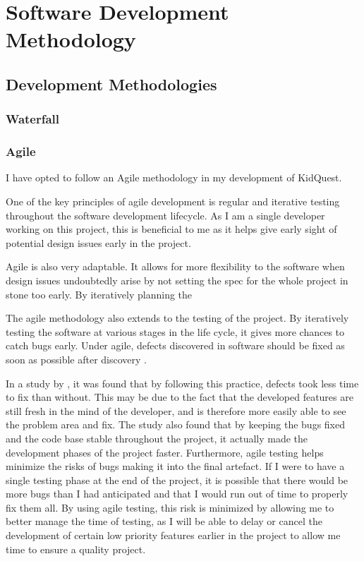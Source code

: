 \chapter{Software Development Methodology}

\section{Development Methodologies}

\subsection{Waterfall}

\subsection{Agile}
I have opted to follow an Agile methodology in my development of KidQuest.

One of the key principles of agile development is regular and iterative testing throughout the software development lifecycle.
As I am a single developer working on this project, this is beneficial to me as it helps give early sight of potential design issues early in the project.

Agile is also very adaptable.
It allows for more flexibility to the software when design issues undoubtedly arise by not setting the spec for the whole project in stone too early.
By iteratively planning the 

The agile methodology also extends to the testing of the project.
By iteratively testing the software at various stages in the life cycle, it gives more chances to catch bugs early.
Under agile, defects discovered in software should be fixed as soon as possible after discovery \citep{beck2001agile}.

In a study by \cite{talby2006}, it was found that by following this practice, defects took less time to fix than without.
This may be due to the fact that the developed features are still fresh in the mind of the developer, and is therefore more easily able to see the problem area and fix.
The study also found that by keeping the bugs fixed and the code base stable throughout the project, it actually made the development phases of the project faster.
Furthermore, agile testing helps minimize the risks of bugs making it into the final artefact. 
If I were to have a single testing phase at the end of the project, it is possible that there would be more bugs than I had anticipated and that I would run out of time to properly fix them all. 
By using agile testing, this risk is minimized by allowing me to better manage the time of testing, as I will be able to delay or cancel the development of certain low priority features earlier in the project to allow me time to ensure a quality project.

